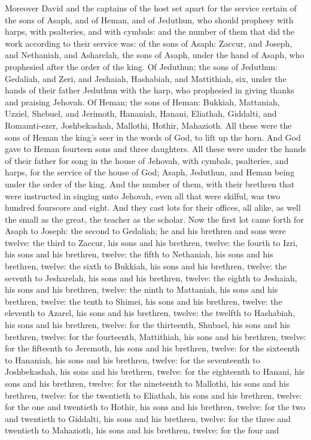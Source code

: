 Moreover David and the captains of the host set apart for the service certain of the sons of Asaph, and of Heman, and of Jeduthun, who should prophesy with harps, with psalteries, and with cymbals: and the number of them that did the work according to their service was: of the sons of Asaph: Zaccur, and Joseph, and Nethaniah, and Asharelah, the sons of Asaph, under the hand of Asaph, who prophesied after the order of the king. Of Jeduthun; the sons of Jeduthun: Gedaliah, and Zeri, and Jeshaiah, Hashabiah, and Mattithiah, six, under the hands of their father Jeduthun with the harp, who prophesied in giving thanks and praising Jehovah. Of Heman; the sons of Heman: Bukkiah, Mattaniah, Uzziel, Shebuel, and Jerimoth, Hananiah, Hanani, Eliathah, Giddalti, and Romamti-ezer, Joshbekashah, Mallothi, Hothir, Mahazioth. All these were the sons of Heman the king’s seer in the words of God, to lift up the horn. And God gave to Heman fourteen sons and three daughters. All these were under the hands of their father for song in the house of Jehovah, with cymbals, psalteries, and harps, for the service of the house of God; Asaph, Jeduthun, and Heman being under the order of the king. And the number of them, with their brethren that were instructed in singing unto Jehovah, even all that were skilful, was two hundred fourscore and eight. And they cast lots for their offices, all alike, as well the small as the great, the teacher as the scholar.  Now the first lot came forth for Asaph to Joseph: the second to Gedaliah; he and his brethren and sons were twelve: the third to Zaccur, his sons and his brethren, twelve: the fourth to Izri, his sons and his brethren, twelve: the fifth to Nethaniah, his sons and his brethren, twelve: the sixth to Bukkiah, his sons and his brethren, twelve: the seventh to Jesharelah, his sons and his brethren, twelve: the eighth to Jeshaiah, his sons and his brethren, twelve: the ninth to Mattaniah, his sons and his brethren, twelve: the tenth to Shimei, his sons and his brethren, twelve: the eleventh to Azarel, his sons and his brethren, twelve: the twelfth to Hashabiah, his sons and his brethren, twelve: for the thirteenth, Shubael, his sons and his brethren, twelve: for the fourteenth, Mattithiah, his sons and his brethren, twelve: for the fifteenth to Jeremoth, his sons and his brethren, twelve: for the sixteenth to Hananiah, his sons and his brethren, twelve: for the seventeenth to Joshbekashah, his sons and his brethren, twelve: for the eighteenth to Hanani, his sons and his brethren, twelve: for the nineteenth to Mallothi, his sons and his brethren, twelve: for the twentieth to Eliathah, his sons and his brethren, twelve: for the one and twentieth to Hothir, his sons and his brethren, twelve: for the two and twentieth to Giddalti, his sons and his brethren, twelve: for the three and twentieth to Mahazioth, his sons and his brethren, twelve: for the four and 
